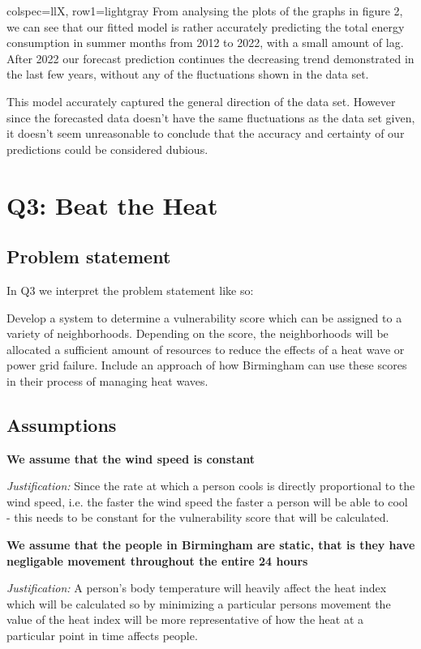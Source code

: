 \documentclass[11pt]{article}
\begin{document}
\begin{longtblr}[
  caption={Variables and parameters.}
]{
  colspec={llX},
  row{1}={lightgray}
}
From analysing the plots of the graphs in figure 2, we can see that our fitted model is rather accurately predicting the
total energy consumption in summer months from 2012 to 2022, with a small amount of lag. After 2022 our forecast prediction
continues the decreasing trend demonstrated in the last few years, without any of the fluctuations shown in the data set.

This model accurately captured the general direction of the data set. However since the forecasted data doesn't have the same
fluctuations as the data set given, it doesn't seem unreasonable to conclude that the accuracy and certainty of our
predictions could be considered dubious.

\section{Q3: Beat the Heat}
\subsection{Problem statement}

In Q3 we interpret the problem statement like so:

Develop a system to determine a vulnerability score which can be assigned to a  variety of neighborhoods. Depending on the score, the neighborhoods will be allocated a sufficient amount of resources to reduce the effects of a heat wave or power grid failure. Include an approach of how Birmingham can use these scores in their process of managing heat waves.

\subsection{Assumptions}
\textbf{\sffamily We assume that the wind speed is constant}

\textit{Justification:} Since the rate at which a person cools is directly proportional to the wind speed, i.e. the faster the wind speed the faster a person will be able to cool - this needs to be constant for the vulnerability score that will be calculated.

\noindent
\textbf{\sffamily We assume that the people in Birmingham are static, that is they have negligable movement throughout the entire 24 hours}

\textit{Justification:} A person's body temperature will heavily affect the heat index which will be calculated so by minimizing a particular persons movement the value of the heat index will be more representative of how the heat at a particular point in time affects people.


\end{longtblr}
\end{document}
